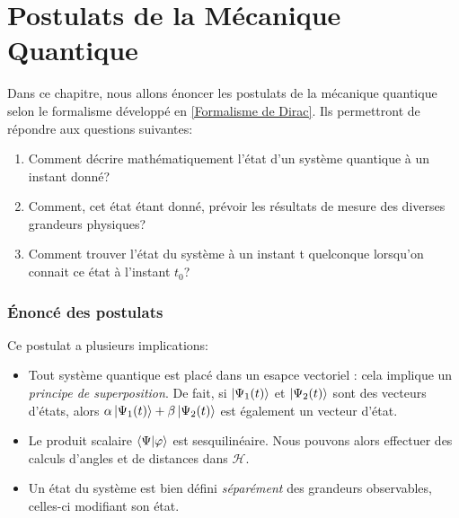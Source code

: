 \documentclass[../notesdecours.tex]{subfiles}
\begin{document}
\newpage
\part{Postulats de la Mécanique Quantique}
Dans ce chapitre, nous allons énoncer les postulats de la mécanique quantique selon le formalisme développé en \ref{Formalisme de Dirac}. Ils permettront de répondre aux questions suivantes:
\begin{enumerate}
\item Comment décrire mathématiquement l'état d'un système quantique à un instant donné?
\item Comment, cet état étant donné, prévoir les résultats de mesure des diverses grandeurs physiques?
\item Comment trouver l'état du système à un instant t quelconque lorsqu'on connait  ce état à l'instant $t_0$?
\end{enumerate}
\section{Énoncé des postulats}

\begin{center}
\end{center}
Ce postulat a plusieurs implications:
\begin{itemize}
\item Tout système quantique est placé dans un esapce vectoriel : cela implique un \textit{principe de superposition}. De fait, si $\ket{\Psi_1 (t)}$ et $\ket{\Psi_2 (t)}$ sont des vecteurs d'états, alors $\alpha \ket{\Psi_1 (t)} + \beta\ket{\Psi_2 (t)}$ est également un vecteur d'état.
\item Le produit scalaire $\braket{\Psi|\varphi}$ est sesquilinéaire. Nous pouvons alors effectuer des calculs d'angles et de distances dans $\mathcal{H}$.
\item Un état du système est bien défini \textit{séparément} des grandeurs observables, celles-ci modifiant son état.
\end{itemize}
\end{document}
